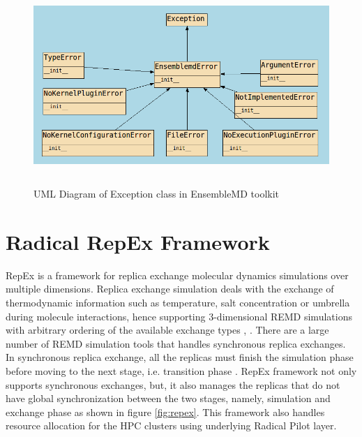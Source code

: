 \documentclass[10pt]{ruthesis}
\begin{document}
\begin{figure}[h]
  \centering
  \includegraphics[width=12cm,height=7.5cm]{exception.png}
  \caption{UML Diagram of Exception class in EnsembleMD toolkit}
  \label{fig:umlexception}
\end{figure}


\section{Radical RepEx Framework}
RepEx is a framework for replica exchange molecular dynamics simulations over multiple dimensions. Replica exchange simulation deals with the exchange of thermodynamic information such as temperature, salt concentration or umbrella during molecule interactions, hence supporting 3-dimensional REMD simulations with arbitrary ordering of the available exchange types \cite{ref5}, \cite{site2}.  There are a large number of REMD simulation tools that handles synchronous replica exchanges. In synchronous replica exchange, all the replicas must finish the simulation phase before moving to the next stage, i.e. transition phase \cite{ref5}. RepEx framework not only supports synchronous exchanges, but, it also manages the replicas that do not have global synchronization between the two stages, namely, simulation and exchange phase as shown in figure \ref{fig:repex}. This framework also handles resource allocation for the HPC clusters using underlying Radical Pilot layer.
\end{document}
